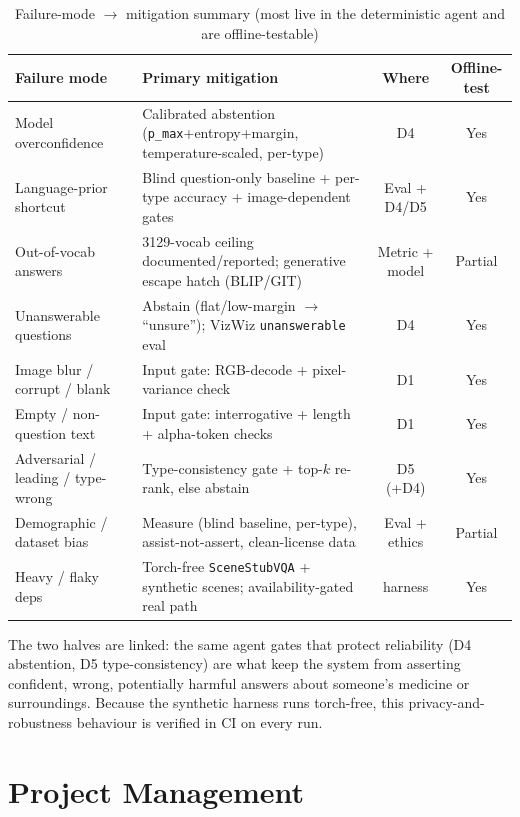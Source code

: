 \documentclass[12pt,a4paper]{article}
\begin{document}
\begin{table}[H]
\centering
\caption{Failure-mode $\rightarrow$ mitigation summary (most live in the deterministic agent and are offline-testable)}
\small
\setlength{\tabcolsep}{4pt}
\begin{tabularx}{\linewidth}{@{} L L c c @{}}
\toprule
\textbf{Failure mode} & \textbf{Primary mitigation} & \textbf{Where} & \textbf{Offline-test} \\
\midrule
Model overconfidence & Calibrated abstention (\texttt{p\_max}+entropy+margin, temperature-scaled, per-type) & D4 & Yes \\
Language-prior shortcut & Blind question-only baseline + per-type accuracy + image-dependent gates & Eval + D4/D5 & Yes \\
Out-of-vocab answers & 3129-vocab ceiling documented/reported; generative escape hatch (BLIP/GIT) & Metric + model & Partial \\
Unanswerable questions & Abstain (flat/low-margin $\rightarrow$ ``unsure''); VizWiz \texttt{unanswerable} eval & D4 & Yes \\
Image blur / corrupt / blank & Input gate: RGB-decode + pixel-variance check & D1 & Yes \\
Empty / non-question text & Input gate: interrogative + length + alpha-token checks & D1 & Yes \\
Adversarial / leading / type-wrong & Type-consistency gate + top-$k$ re-rank, else abstain & D5 (+D4) & Yes \\
Demographic / dataset bias & Measure (blind baseline, per-type), assist-not-assert, clean-license data & Eval + ethics & Partial \\
Heavy / flaky deps & Torch-free \texttt{SceneStubVQA} + synthetic scenes; availability-gated real path & harness & Yes \\
\bottomrule
\end{tabularx}
\end{table}

The two halves are linked: the same agent gates that protect reliability (D4 abstention, D5 type-consistency) are what keep the system from asserting confident, wrong, potentially harmful answers about someone's medicine or surroundings. Because the synthetic harness runs torch-free, this privacy-and-robustness behaviour is verified in CI on every run.

\section{Project Management}
\end{document}

